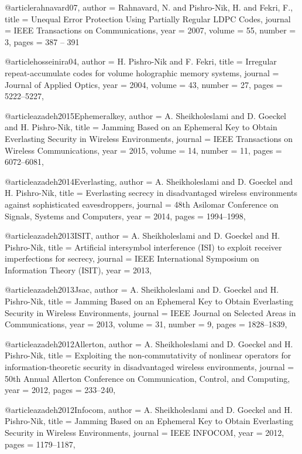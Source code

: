 {{{{{{{{@article{rahnavard07,
 author = {Rahnavard, N. and Pishro-Nik, H. and Fekri, F.},
 title = {Unequal Error Protection Using Partially Regular LDPC Codes},
 journal = {IEEE Transactions on Communications},
 year = {2007},
 volume = {55},
 number = {3},
 pages = {387 -- 391}
 }


 @article{hosseinira04,
 author = {H. Pishro-Nik and F. Fekri},
 title = {Irregular repeat-accumulate codes for volume holographic memory systems},
 journal = {Journal of Applied Optics},
 year = {2004},
 volume = {43},
 number = {27},
 pages = {5222--5227},
 }


@article{azadeh2015Ephemeralkey,
 author = {A. Sheikholeslami and D. Goeckel and H. Pishro-Nik},
 title = {Jamming Based on an Ephemeral Key to Obtain Everlasting Security in Wireless Environments},
 journal = {IEEE Transactions on Wireless Communications},
 year = {2015},
 volume = {14},
 number = {11},
 pages = {6072--6081},
}


@article{azadeh2014Everlasting,
 author = {A. Sheikholeslami and D. Goeckel and H. Pishro-Nik},
 title = {Everlasting secrecy in disadvantaged wireless environments against sophisticated eavesdroppers},
 journal = {48th Asilomar Conference on Signals, Systems and Computers},
 year = {2014},
 pages = {1994--1998},
}


@article{azadeh2013ISIT,
 author = {A. Sheikholeslami and D. Goeckel and H. Pishro-Nik},
 title = {Artificial intersymbol interference (ISI) to exploit receiver imperfections for secrecy},
 journal = {IEEE International Symposium on Information Theory (ISIT)},
 year = {2013},
}


@article{azadeh2013Jsac,
 author = {A. Sheikholeslami and D. Goeckel and H. Pishro-Nik},
 title = {Jamming Based on an Ephemeral Key to Obtain Everlasting Security in Wireless Environments},
 journal = {IEEE Journal on Selected Areas in Communications},
 year = {2013},
 volume = {31},
 number = {9},
 pages = {1828--1839},
}


@article{azadeh2012Allerton,
 author = {A. Sheikholeslami and D. Goeckel and H. Pishro-Nik},
 title = {Exploiting the non-commutativity of nonlinear operators for information-theoretic security in disadvantaged wireless environments},
 journal = {50th Annual Allerton Conference on Communication, Control, and Computing},
 year = {2012},
 pages = {233--240},
}


@article{azadeh2012Infocom,
 author = {A. Sheikholeslami and D. Goeckel and H. Pishro-Nik},
 title = {Jamming Based on an Ephemeral Key to Obtain Everlasting Security in Wireless Environments},
 journal = {IEEE INFOCOM},
 year = {2012},
 pages = {1179--1187},
}

}}}}}}}}
